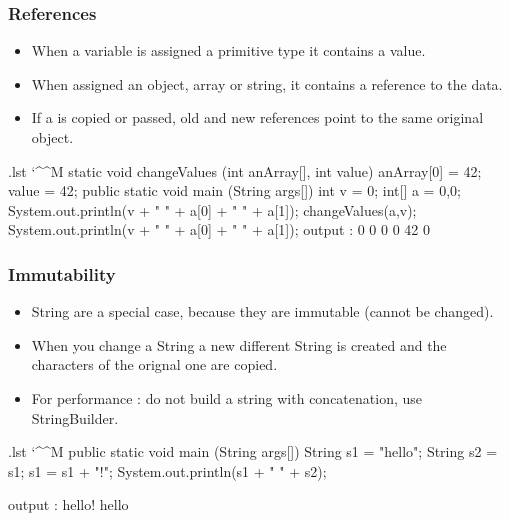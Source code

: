 \documentclass[10pt,handout]{beamer}
\makeatletter
\newenvironment{code}{%
  \begingroup
  \@bsphack
  \immediate\openout\lstvrb@out\jobname.lst
  \let\do\@makeother\dospecials\catcode`\^^M\active
  \def\verbatim@processline{%
    \immediate\write\lstvrb@out{\the\verbatim@line}}%
  \verbatim@start}{%
  \immediate\closeout\lstvrb@out
  \@esphack
  \endgroup
  
  \begin{alertblock}{}
    
  \end{alertblock}}
\makeatother
\begin{document}
\begin{frame}
  \frametitle{References}
  \begin{itemize}
    \item When a variable is assigned a primitive type it contains a value.
    \item When assigned an object, array or string, it contains a reference to the data.
    \item If a is copied or passed, old and new references point to the \alert{same original object}.
  \end{itemize}

  \begin{code}
static void changeValues (int anArray[], int value){
  anArray[0] = 42;
  value = 42;
}
public static void main (String args[]){
  int v = 0; int[] a = {0,0};
  System.out.println(v + " " + a[0] + " " + a[1]);
  changeValues(a,v);
  System.out.println(v + " " + a[0] + " " + a[1]);
} 
output : 
0 0 0
0 42 0
  \end{code}
\end{frame}

\begin{frame}[fragile]
  \frametitle{Immutability}
  \begin{itemize}
    \item String are a special case, because they are immutable (cannot be changed).
    \item When you change a String a new different String is created and the characters of the orignal one are copied.
    \item For performance : do not build a string with concatenation, use StringBuilder.
  \end{itemize}
  \begin{code}
public static void main (String args[]) {
  String s1 = "hello";
  String s2 = s1;
  s1 = s1 + "!";
  System.out.println(s1 + " " + s2);
}

output : 
hello! hello
  \end{code}
\end{frame}
\end{document}
